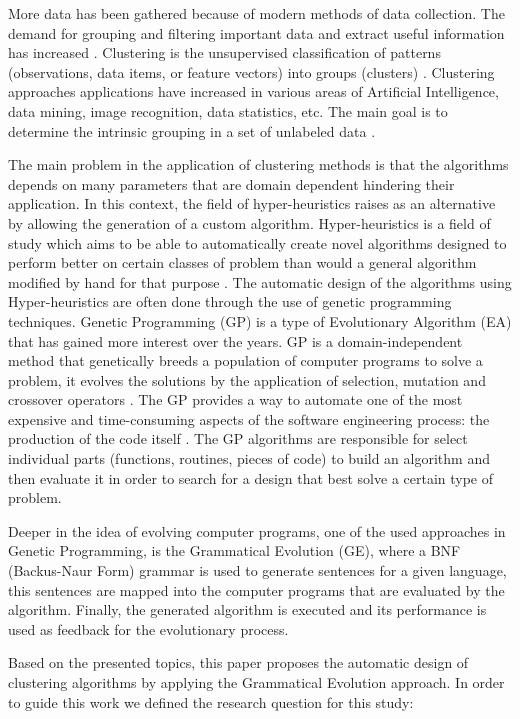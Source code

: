 \documentclass[journal]{IEEEtran}
\begin{document}
	More data has been gathered because of modern methods of data collection. The demand for grouping and filtering important data and extract useful information has increased \cite{ahalya2015data}. Clustering is the unsupervised classification of patterns (observations, data items, or feature vectors) into groups (clusters) \cite{jain1988algorithms}. Clustering approaches applications have increased in various areas of Artificial Intelligence, data mining, image recognition, data statistics, etc. The main goal is to determine the intrinsic grouping in a set of unlabeled data \cite{ahalya2015data}.
	
	The main problem in the application of clustering methods is that the algorithms depends on many parameters that are domain dependent hindering their application. In this context, the field of hyper-heuristics raises as an alternative by allowing the generation of a custom algorithm. Hyper-heuristics is a field of study which aims to be able to automatically create novel algorithms designed to perform better on certain classes of problem than would a general algorithm modified by hand for that purpose \cite{harris2015comparison}. The automatic design of the algorithms using Hyper-heuristics are often done through the use of genetic programming techniques. Genetic Programming (GP) is a type of Evolutionary Algorithm (EA) that has gained more interest over the years. GP is a domain-independent method that genetically breeds a population of computer programs to solve a problem, it evolves the solutions by the application of selection, mutation and crossover operators \cite{poli2014genetic}. The GP provides a way to automate one of the most expensive and time-consuming aspects of the software engineering process: the production of the code itself \cite{langdon2013optimising}. The GP algorithms are responsible for select individual parts (functions, routines, pieces of code) to build an algorithm and then evaluate it in order to search for a design that best solve a certain type of problem.
	
	Deeper in the idea of evolving computer programs, one of the used approaches in Genetic Programming, is the Grammatical Evolution (GE), where a BNF (Backus-Naur Form) grammar is used to generate sentences for a given language, this sentences are mapped into the computer programs that are evaluated by the algorithm. Finally, the generated algorithm is executed and its performance is used as feedback for the evolutionary process.
	
	Based on the presented topics, this paper proposes the automatic design of clustering algorithms by applying the Grammatical Evolution approach. In order to guide this work we defined the research question for this study:
	
\end{document}
